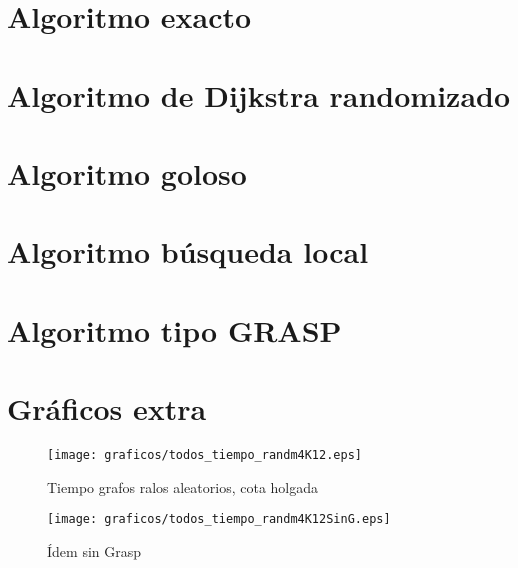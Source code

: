 \section{Algoritmo exacto}
\label{exacto-codigo}


\newpage

\section{Algoritmo de Dijkstra randomizado}
\label{dijkstra-codigo}



\newpage

\section{Algoritmo goloso}
\label{goloso-codigo}


\newpage

\section{Algoritmo búsqueda local}
\label{busqueda-local-codigo}


\newpage

\section{Algoritmo tipo GRASP}
\label{grasp-codigo}


\newpage

\section{Gráficos extra}
\label{graficos-extra}
\begin{figure}[H]
    \begin{minipage}{0.5\linewidth}
      \texttt{[image: graficos/todos\_tiempo\_randm4K12.eps]}
      \caption{Tiempo grafos ralos aleatorios, cota holgada}\label{fig:extra1}
    \end{minipage}
    \hfill
    \begin{minipage}{0.5\linewidth}
      \texttt{[image: graficos/todos\_tiempo\_randm4K12SinG.eps]}
      \caption{Ídem sin Grasp}\label{fig:extra2}
    \end{minipage}    
\end{figure}

